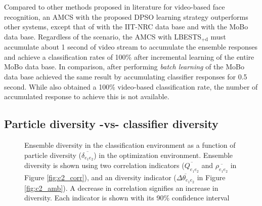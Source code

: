 Compared to other methods proposed in literature for video-based face recognition, an AMCS with the proposed DPSO learning strategy outperforms other systems, except that of \cite{arandjelovic09} with the IIT-NRC data base and \cite{zhou03} with the MoBo data base.
Regardless of the scenario, the AMCS with LBESTS$_\text{+d}$ must accumulate about 1 second of video stream to accumulate the ensemble responses and achieve a classification rates of 100\% after incremental learning of the entire MoBo data base.
In comparison, after performing \emph{batch learning} of the MoBo data base
\cite{zhou03} achieved the same result by accumulating classifier responses for 0.5 second.
While \cite{arandjelovic09} also obtained a 100\% video-based classification rate, the number of accumulated response to achieve this is not available.

\subsection{Particle diversity -vs- classifier diversity}
\label{sec:c2_expDiv}

\begin{figure*}[t]
  \centering
  \caption{Ensemble diversity in the classification environment as a function of particle diversity ($\overline{\delta_{e_1e_2}}$) in the optimization environment.
Ensemble diversity is shown using two correlation indicators ($\overline{Q_{e_1e_2}}$ and $\overline{\rho_{e_1e_2}}$ in Figure \ref{fig:c2_corr}), and an diversity indicator ($\overline{\Delta\theta_{e_1e_2}}$ in Figure \ref{fig:c2_amb}).
A decrease in correlation signifies an increase in diversity.
Each indicator is shown with its 90\% confidence interval}
  \label{fig:c2_diversity}
\end{figure*}

